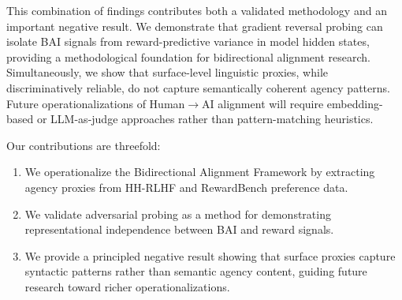 This combination of findings contributes both a validated methodology and an important negative result. We demonstrate that gradient reversal probing can isolate BAI signals from reward-predictive variance in model hidden states, providing a methodological foundation for bidirectional alignment research. Simultaneously, we show that surface-level linguistic proxies, while discriminatively reliable, do not capture semantically coherent agency patterns. Future operationalizations of Human$\rightarrow$AI alignment will require embedding-based or LLM-as-judge approaches rather than pattern-matching heuristics.

Our contributions are threefold:
\begin{enumerate}
    \item We operationalize the Bidirectional Alignment Framework by extracting agency proxies from HH-RLHF and RewardBench preference data.
    \item We validate adversarial probing as a method for demonstrating representational independence between BAI and reward signals.
    \item We provide a principled negative result showing that surface proxies capture syntactic patterns rather than semantic agency content, guiding future research toward richer operationalizations.
\end{enumerate}
